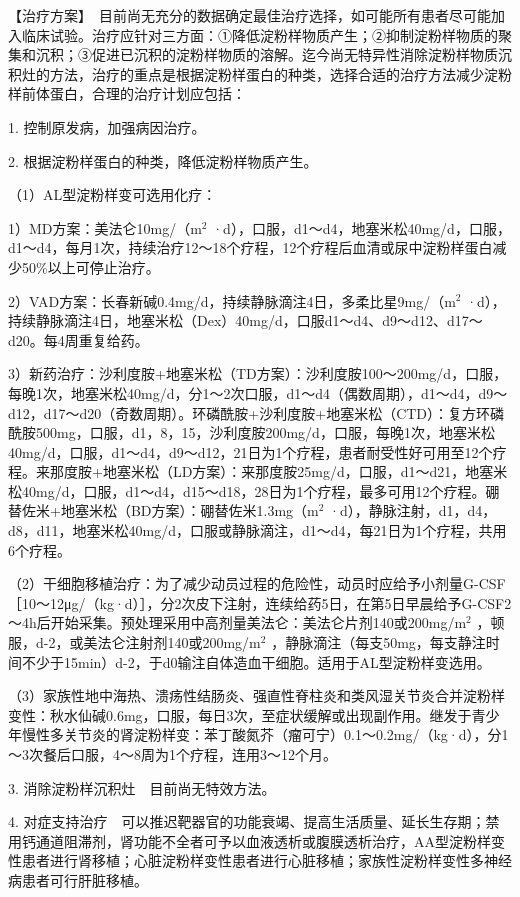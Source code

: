 【治疗方案】　目前尚无充分的数据确定最佳治疗选择，如可能所有患者尽可能加入临床试验。治疗应针对三方面：①降低淀粉样物质产生；②抑制淀粉样物质的聚集和沉积；③促进已沉积的淀粉样物质的溶解。迄今尚无特异性消除淀粉样物质沉积灶的方法，治疗的重点是根据淀粉样蛋白的种类，选择合适的治疗方法减少淀粉样前体蛋白，合理的治疗计划应包括：

1. 控制原发病，加强病因治疗。

2. 根据淀粉样蛋白的种类，降低淀粉样物质产生。

（1）AL型淀粉样变可选用化疗：

1）MD方案：美法仑10mg/（m$^2$
·d），口服，d1～d4，地塞米松40mg/d，口服，d1～d4，每月1次，持续治疗12～18个疗程，12个疗程后血清或尿中淀粉样蛋白减少50\%以上可停止治疗。

2）VAD方案：长春新碱0.4mg/d，持续静脉滴注4日，多柔比星9mg/（m$^2$
·d），持续静脉滴注4日，地塞米松（Dex）40mg/d，口服d1～d4、d9～d12、d17～d20。每4周重复给药。

3）新药治疗：沙利度胺+地塞米松（TD方案）：沙利度胺100～200mg/d，口服，每晚1次，地塞米松40mg/d，分1～2次口服，d1～d4（偶数周期），d1～d4，d9～d12，d17～d20（奇数周期）。环磷酰胺+沙利度胺+地塞米松（CTD）：复方环磷酰胺500mg，口服，d1，8，15，沙利度胺200mg/d，口服，每晚1次，地塞米松40mg/d，口服，d1～d4，d9～d12，21日为1个疗程，患者耐受性好可用至12个疗程。来那度胺+地塞米松（LD方案）：来那度胺25mg/d，口服，d1～d21，地塞米松40mg/d，口服，d1～d4，d15～d18，28日为1个疗程，最多可用12个疗程。硼替佐米+地塞米松（BD方案）：硼替佐米1.3mg（m$^2$
·d），静脉注射，d1，d4，d8，d11，地塞米松40mg/d，口服或静脉滴注，d1～d4，每21日为1个疗程，共用6个疗程。

（2）干细胞移植治疗：为了减少动员过程的危险性，动员时应给予小剂量G-CSF［10～12μg/（kg·d）］，分2次皮下注射，连续给药5日，在第5日早晨给予G-CSF2～4h后开始采集。预处理采用中高剂量美法仑：美法仑片剂140或200mg/m$^2$
，顿服，d-2，或美法仑注射剂140或200mg/m$^2$
，静脉滴注（每支50mg，每支静注时间不少于15min）d-2，于d0输注自体造血干细胞。适用于AL型淀粉样变选用。

（3）家族性地中海热、溃疡性结肠炎、强直性脊柱炎和类风湿关节炎合并淀粉样变性：秋水仙碱0.6mg，口服，每日3次，至症状缓解或出现副作用。继发于青少年慢性多关节炎的肾淀粉样变：苯丁酸氮芥（瘤可宁）0.1～0.2mg/（kg·d），分1～3次餐后口服，4～8周为1个疗程，连用3～12个月。

3. 消除淀粉样沉积灶　目前尚无特效方法。

4.
对症支持治疗　可以推迟靶器官的功能衰竭、提高生活质量、延长生存期；禁用钙通道阻滞剂，肾功能不全者可予以血液透析或腹膜透析治疗，AA型淀粉样变性患者进行肾移植；心脏淀粉样变性患者进行心脏移植；家族性淀粉样变性多神经病患者可行肝脏移植。

